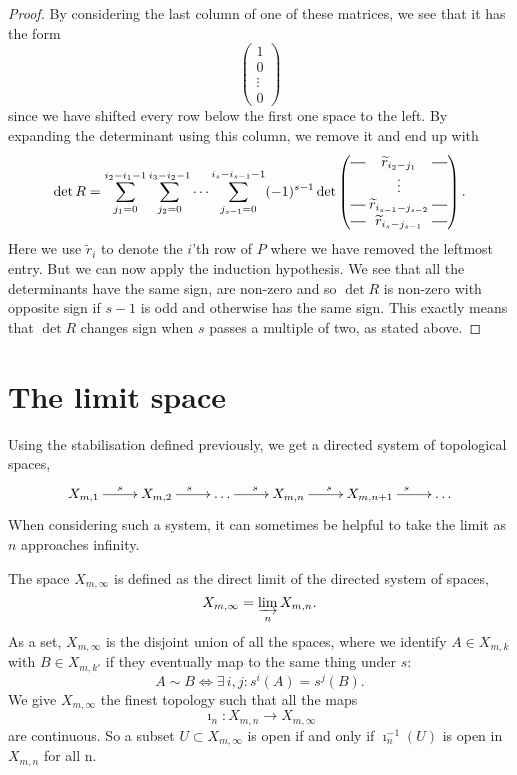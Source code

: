 \begin{proof}
  By considering the last column of one of these matrices, we see that
  it has the form
  \[
  \begin{pmatrix}
    1 \\
    0 \\
    \vdots \\
    0
  \end{pmatrix} \]
  since we have shifted every row below the first one space to the
  left. By expanding the determinant using this column, we remove it and
  end up with
  \[ \det R = \sum_{j_1 = 0}^{i_2-i_1-1}\sum_{j_2 = 0}^{i_3-i_2-1}
  \dots \sum_{j_{s-1}=0}^{i_s-i_{s-1}-1} (-1)^{s-1} \det
  \begin{pmatrix}
    \matrow{\widetilde{r}_{i_2-j_1}} \\
    & \hspace{-0.75em} \vdots & \\
    \matrow{\widetilde{r}_{i_{s-1}-j_{s-2}}} \\
    \matrow{\widetilde{r}_{i_s-j_{s-1}}}
  \end{pmatrix}. \]
  Here we use $\widetilde{r}_i$ to denote the $i$'th row of $P$ where we
  have removed the leftmost entry. But we can now apply the induction
  hypothesis. We see that all the determinants have the same sign, are
  non-zero and
  so $\det R$ is non-zero with opposite sign if $s-1$ is odd and
  otherwise has the
  same sign. This exactly means that $\det R$ changes sign
  when $s$ passes a multiple of two, as stated above.
\end{proof}

\section{The limit space}
\label{sec:rum-gr}

Using the stabilisation defined previously, we get a directed system
of topological spaces,
\[ \xymatrix{X_{m,1} \ar[r]^s & X_{m,2} \ar[r]^s & \dots \ar[r]^s &
  X_{m,n} \ar[r]^s & X_{m,n+1} \ar[r]^s & \dots } \]
When considering such a system, it can sometimes be helpful to
take the limit as $n$ approaches infinity.

\begin{definition}
  The space $X_{m,\infty}$ is defined as the direct limit of the
  directed system of spaces,
  \[ X_{m,\infty} = \varinjlim_n X_{m,n}. \]
  As a set, $X_{m,\infty}$ is the disjoint union of all the spaces,
  where we identify $A \in X_{m,k}$ with $B \in X_{m,k'}$ if they
  eventually map to the same thing under $s$:
  \[ A \sim B \iff \exists\, i,j : s^i(A) = s^j(B). \]
  We give $X_{m,\infty}$ the finest topology such that all the
  maps 
  \[ \imath_n : X_{m,n} \to X_{m,\infty} \]
  are continuous. So a subset $U \subset X_{m,\infty}$ is open if and
  only if $\imath_n^{-1}(U)$ is open in $X_{m,n}$ for all n.
\end{definition}

